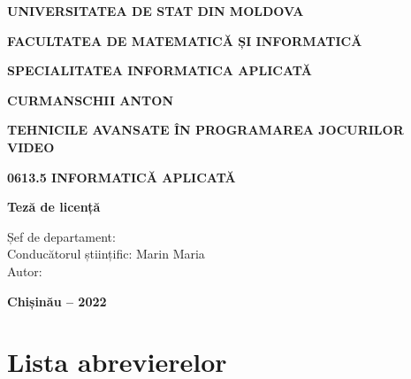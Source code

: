 \documentclass[a4paper,12pt]{report}
\newcommand{\authorName}{Curmanschii Anton}
\newcommand{\thesisTitle}{Tehnicile avansate în programarea jocurilor video}
\newcommand{\programulDeStudii}{licență}
\begin{document}
\sloppy

\begin{titlepage}
  \vspace*{\fill}
  \begin{center}
      \vspace*{1cm}

      \large
      \uppercase{\textbf{UNIVERSITATEA DE STAT DIN MOLDOVA\\}}

      \normalsize
      \uppercase{\textbf{FACULTATEA DE MATEMATICĂ și INFORMATICĂ}}
      \vspace{0.1cm}

      \normalsize
      \uppercase{\textbf{SPECIALITATEA INFORMATICA APLICATĂ}}
      \vspace{3.0cm}

      \large
      \textbf{\uppercase\expandafter{\authorName}}
      \vspace{1.5cm}

      \Large
      \textbf{\uppercase\expandafter{\thesisTitle}}
      \vspace{0.75cm}

      \large
      \uppercase{\textbf{0613.5 Informatică aplicată}}
      \vspace{0.5cm}

      \normalsize
      \textbf{Teză de \programulDeStudii{}}
  
    \end{center}
  \vfill

  \normalsize
  \begin{flushleft}
    Șef de departament: \\
    Conducătorul științific: Marin Maria \\
    Autor:
  \end{flushleft}

  \begin{center}
    \textbf{Chișinău -- 2022}
  \end{center}

\end{titlepage}

\clearpage
\tableofcontents

\clearpage
\chapter*{Lista abrevierelor}
\begin{acronym}
\end{acronym}
\end{document}
